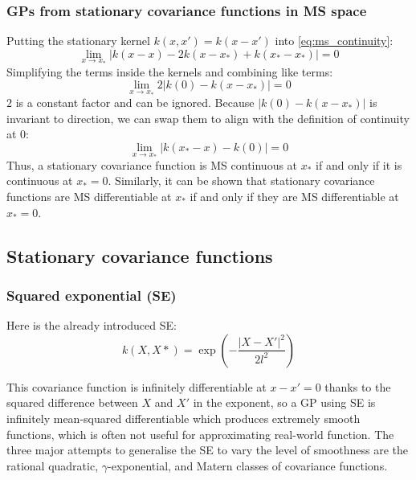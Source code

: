 

\subsubsection{GPs from stationary covariance functions in MS space}
Putting the stationary kernel $k(x,x') = k(x - x')$ into \ref{eq:ms_continuity}:
\begin{equation*}
    \lim_{x \to x_*} | k(x - x) - 2k(x - x_*) + k(x_* - x_*) | = 0
\end{equation*}
Simplifying the terms inside the kernels and combining like terms:
\begin{equation*}
    \lim_{x \to x_*} 2 | k(0) - k(x - x_*) | = 0
\end{equation*}
$2$ is a constant factor and can be ignored. Because $ | k(0) - k(x - x_*) |$ is invariant to direction, we can swap them to align with the definition of continuity at 0:
\begin{equation*}
    \lim_{x \to x_*} | k(x_* - x) - k(0) | = 0
\end{equation*}
Thus, a stationary covariance function is MS continuous at $x_*$ if and only if it is continuous at $x_* = 0$. Similarly, it can be shown that stationary covariance functions are MS differentiable at $x_*$ if and only if they are MS differentiable at $x_* = 0$.


\subsection{Stationary covariance functions \cite{gp-ml}}

\subsubsection{Squared exponential (SE)}
Here is the already introduced SE:
\begin{equation*}
    k(X,X*) = \exp \left(- \frac{|X - X'|^2}{2l^2} \right)
\end{equation*}

This covariance function is infinitely differentiable at $x - x' = 0$ thanks to the squared difference between $X$ and $X'$ in the exponent, so a GP using SE is infinitely mean-squared differentiable which produces extremely smooth functions, which is often not useful for approximating real-world function. The three major attempts to generalise the SE to vary the level of smoothness are the rational quadratic, $\gamma$-exponential, and Matern classes of covariance functions.

